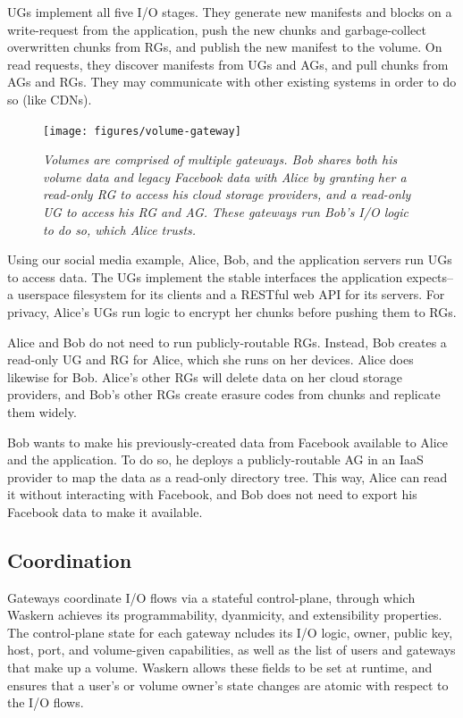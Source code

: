 UGs implement all five I/O stages. They generate new manifests and blocks on a
write-request from the application, push the new chunks and garbage-collect
overwritten chunks from RGs, and publish the new manifest to the volume. On read
requests, they discover manifests from UGs and AGs, and pull chunks from AGs and
RGs. They may communicate with other existing systems in order to do so (like
CDNs).

\begin{figure}
\centering
\texttt{[image: figures/volume-gateway]}
\caption{\it Volumes are comprised of multiple gateways.  Bob shares both his
volume data and legacy Facebook data with Alice by granting her a read-only RG
to access his cloud storage providers, and a read-only UG to access his RG and
AG.  These gateways run Bob's I/O logic to do so, which Alice trusts.}
\label{fig:volume-gateway}
\end{figure}

Using our social media example, Alice, Bob, and the application servers run UGs
to access data. The UGs implement the stable interfaces the application
expects--a userspace filesystem for its clients and a RESTful web API for its
servers. For privacy, Alice's UGs run logic to encrypt her chunks before
pushing them to RGs.

Alice and Bob do not need to run publicly-routable RGs. Instead, Bob creates
a read-only UG and RG for Alice, which she runs on her devices. Alice does
likewise for Bob.  Alice's other RGs will delete data on her cloud storage
providers, and Bob's other RGs create erasure codes from chunks and
replicate them widely.

Bob wants to make his previously-created data from Facebook available to Alice
and the application.  To do so, he deploys a publicly-routable AG in an IaaS
provider to map the data as a read-only directory tree. This way, Alice can
read it without interacting with Facebook, and Bob does not need to export his
Facebook data to make it available.

\subsection{Coordination}

Gateways coordinate I/O flows via a stateful control-plane, through which
Waskern achieves its programmability, dyanmicity, and extensibility
properties. The control-plane state for each gateway ncludes its I/O logic,
owner, public key, host, port, and volume-given capabilities, as well as the
list of users and gateways that make up a volume. Waskern allows these fields
to be set at runtime, and ensures that a user's or volume owner's state
changes are atomic with respect to the I/O flows.

